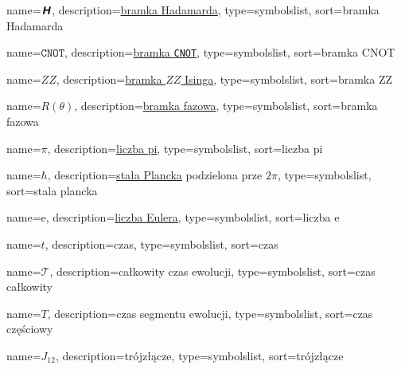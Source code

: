 {
    name=\ensuremath{\textbf{\textit{\textsf H}}},
    description={\href{https://en.wikipedia.org/wiki/Quantum_logic_gate\#Hadamard_(H)_gate}{bramka Hadamarda}},
    type=symbolslist,
    sort=bramka Hadamarda
}

{
    name=\ensuremath{\mathtt{CNOT}},
    description={\href{https://en.wikipedia.org/wiki/Controlled_NOT_gate}{bramka \texttt{CNOT}}},
    type=symbolslist,
    sort=bramka CNOT
}

{
    name=\ensuremath{ZZ},
    description={\href{https://en.wikipedia.org/wiki/Quantum_logic_gate\#Ising_(ZZ)_coupling_gate
}{bramka $ZZ$ Isinga}},
    type=symbolslist,
    sort=bramka ZZ
    }


{
    name=\ensuremath{R(\theta)},
    description={\href{https://en.wikipedia.org/wiki/Quantum_logic_gate\#Phase_shift_(\%7F'\%22\%60UNIQ--postMath-00000032-QINU\%60\%22'\%7F)_gates}{bramka fazowa}},
    type=symbolslist,
    sort=bramka fazowa
}

\let\piOld\pi
{}
{
    name=\ensuremath{\piOld},
    description={\href{https://pl.wikipedia.org/wiki/Pi}{liczba pi}},
    type=symbolslist,
    sort=liczba pi
}

 
{
    name=\ensuremath{\hbar},
    description={\href{https://en.wikipedia.org/wiki/Planck_constant}{stała Plancka} podzielona prze $2\pi$},
    type=symbolslist,
    sort=stala plancka
}


{
    name=\ensuremath{\mathrm e},
    description={\href{https://pl.wikipedia.org/wiki/Podstawa_logarytmu_naturalnego}{liczba Eulera}},
    type=symbolslist,
    sort=liczba e
}

{
    name=\ensuremath{t},
    description={czas},
    type=symbolslist,
    sort=czas
}

{
    name=\ensuremath{\mathcal T},
    description={całkowity czas ewolucji},
    type=symbolslist,
    sort=czas całkowity
}

{
    name=\ensuremath{T},
    description={czas segmentu ewolucji},
    type=symbolslist,
    sort=czas częściowy
}

{
    name=\ensuremath{J_{12}},
    description={trójzłącze},
    type=symbolslist,
    sort=trójzłącze
}


